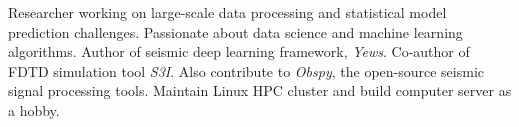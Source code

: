 

\begin{cvparagraph}

Researcher working on large-scale data processing and statistical model prediction challenges. Passionate about data science and machine learning algorithms. Author of seismic deep learning framework, \textit{Yews}. Co-author of FDTD simulation tool \textit{S3I}. Also contribute to \textit{Obspy}, the open-source seismic signal processing tools. Maintain Linux HPC cluster and build computer server as a hobby.
\end{cvparagraph}
